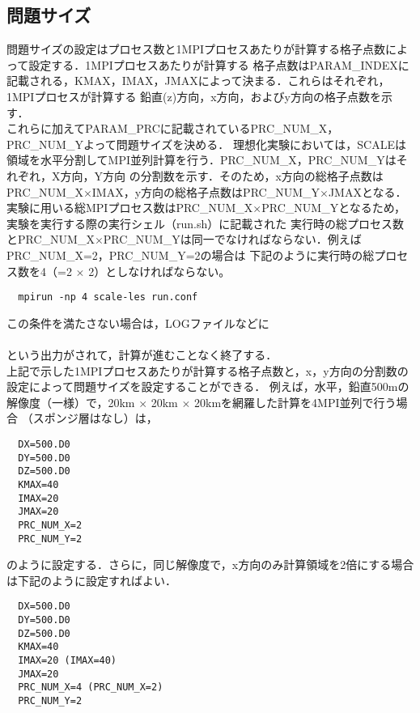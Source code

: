 \subsection{問題サイズ}
問題サイズの設定はプロセス数と1MPIプロセスあたりが計算する格子点数によって設定する．1MPIプロセスあたりが計算する
格子点数はPARAM\_INDEXに記載される，KMAX，IMAX，JMAXによって決まる．これらはそれぞれ，1MPIプロセスが計算する
鉛直(z)方向，x方向，およびy方向の格子点数を示す．\\
これらに加えてPARAM\_PRCに記載されているPRC\_NUM\_X，PRC\_NUM\_Yよって問題サイズを決める．
理想化実験においては，SCALEは領域を水平分割してMPI並列計算を行う．PRC\_NUM\_X，PRC\_NUM\_Yはそれぞれ，X方向，Y方向
の分割数を示す．そのため，x方向の総格子点数はPRC\_NUM\_X$\times$IMAX，y方向の総格子点数はPRC\_NUM\_Y$\times$JMAXとなる．\\
実験に用いる総MPIプロセス数はPRC\_NUM\_X$\times$PRC\_NUM\_Yとなるため，実験を実行する際の実行シェル（run.sh）に記載された
実行時の総プロセス数とPRC\_NUM\_X$\times$PRC\_NUM\_Yは同一でなければならない．例えばPRC\_NUM\_X=2，PRC\_NUM\_Y=2の場合は
下記のように実行時の総プロセス数を4（=2 $\times $ 2）としなければならない。

\begin{verbatim}
  mpirun -np 4 scale-les run.conf
\end{verbatim}

この条件を満たさない場合は，LOGファイルなどに\\
\\

という出力がされて，計算が進むことなく終了する．\\
上記で示した1MPIプロセスあたりが計算する格子点数と，x，y方向の分割数の設定によって問題サイズを設定することができる．
例えば，水平，鉛直500mの解像度（一様）で，20km $\times$ 20km $\times$ 20kmを網羅した計算を4MPI並列で行う場合
（スポンジ層はなし）は， 

\begin{verbatim}
  DX=500.D0
  DY=500.D0
  DZ=500.D0
  KMAX=40
  IMAX=20
  JMAX=20
  PRC_NUM_X=2
  PRC_NUM_Y=2
\end{verbatim}

のように設定する．さらに，同じ解像度で，x方向のみ計算領域を2倍にする場合は下記のように設定すればよい．

\begin{verbatim}
  DX=500.D0
  DY=500.D0
  DZ=500.D0
  KMAX=40
  IMAX=20 (IMAX=40)
  JMAX=20
  PRC_NUM_X=4 (PRC_NUM_X=2)
  PRC_NUM_Y=2
\end{verbatim}

